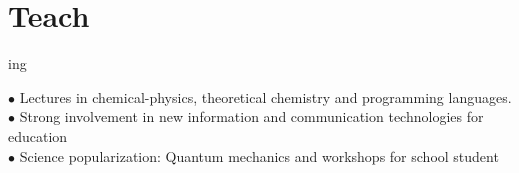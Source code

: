 \documentclass{cv-style}     %
\begin{document}
\vspace{-1mm}
\section{Teach}{ing}
  \vspace{-0.3cm}

$\bullet$ Lectures in chemical-physics, theoretical chemistry and programming languages.\\
$\bullet$ Strong involvement in new information and communication technologies for education\\
$\bullet$ Science popularization: Quantum mechanics and workshops for school student

\vspace*{-5mm}


\end{document}
